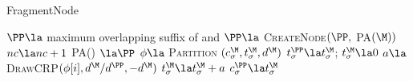 \begin{algorithm}[t!]
	\caption{FragmentNode} \label{alg:fragmentnode}
	\begin{algorithmic}[1]

	
		\State $\PP \la$ maximum overlapping suffix  of \M \space and \Seq
		\State $\PP \la $ \textsc{CreateNode}$(\PP,$ \textsc{PA}$(\M))$
		\State $nc \la nc + 1$
		\State\textsc{ PA}(\M) $\la \PP$
		\For{$\sigma \in \Sigma$}
			\State $\phi \la$ \textsc{Partition} $(c^\M_\sigma, t^\M_\sigma,d^\M)$
			\State $t^\PP_\sigma \la t^\M_\sigma$;  $t^\M_\sigma \la 0$
				\State $a \la$ \textsc{DrawCRP}$(\phi[i],d^\M / d^\PP,-d^\M)$
				\State $t_\sigma^\M \la t_\sigma^\M + a$
			\EndFor
			\State $c^\PP_\sigma \la t^\M_\sigma$
		\EndFor
	\EndFunction
		\end{algorithmic}
\end{algorithm}

